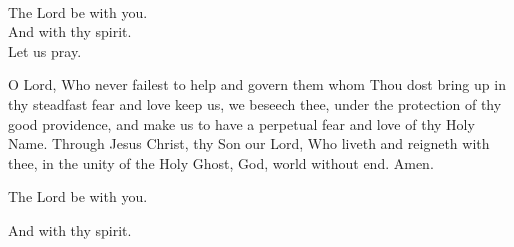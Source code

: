 \\
  \rubric{\Vbar}The Lord be with you.
\\
  \rubric{\Rbar}And with thy spirit.
\\
Let us pray.

O Lord, Who never failest to help and govern them whom Thou dost bring up in thy steadfast fear and love keep us, we beseech thee, under the protection of thy good providence, and make us to have a perpetual fear and love of thy Holy Name. Through Jesus Christ, thy Son our Lord, Who liveth and reigneth with thee, in the unity of the Holy Ghost, God, world without end. \rubric{\Rbar} Amen.

  \rubric{\Vbar}The Lord be with you.

  \rubric{\Rbar}And with thy spirit.

